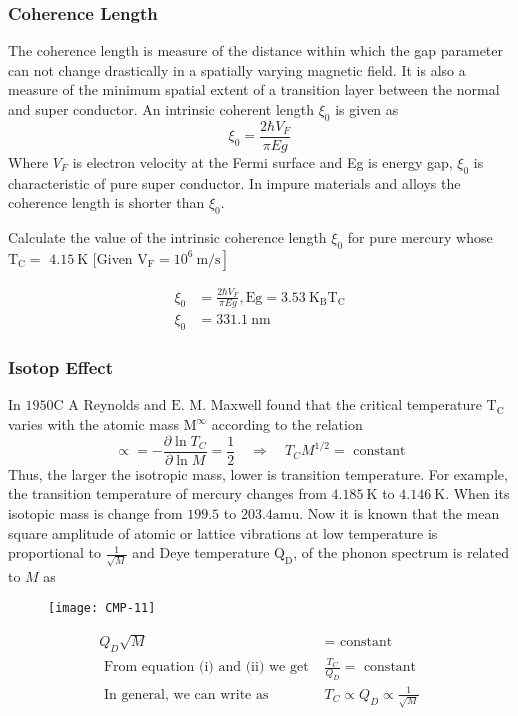 \subsubsection{Coherence Length}
The coherence length is measure of the distance within which the gap parameter can not change drastically in a spatially varying magnetic field. It is also a measure of the minimum spatial extent of a transition layer between the normal and super conductor. An intrinsic coherent length $\xi_{0}$ is given as
$$
\xi_{0}=\frac{2 \hbar V_{F}}{\pi E g}
$$
Where $V_{F}$ is electron velocity at the Fermi surface and Eg is energy gap, $\xi_{0}$ is characteristic of pure super conductor. In impure materials and alloys the coherence length is shorter than $\xi_{0}$.
\begin{exercise}
	 Calculate the value of the intrinsic coherence length $\xi_{0}$ for pure mercury whose $\mathrm{T}_{\mathrm{C}}=$ $4.15 \mathrm{~K}$ [Given $\left.\mathrm{V}_{\mathrm{F}}=10^{6} \mathrm{~m} / \mathrm{s}\right]$
\end{exercise}
\begin{answer}
	\begin{align*}
	\xi_{0}&=\frac{2 \hbar V_{F}}{\pi E g}, \mathrm{Eg}=3.53 \mathrm{~K}_{\mathrm{B}} \mathrm{T}_{\mathrm{C}}\\
	\xi_{0}&=331.1 \mathrm{~nm}
	\end{align*}
\end{answer}
\subsubsection{Isotop Effect}
In $1950 \mathrm{C}$ A Reynolds and $\mathrm{E}$. M. Maxwell found that the critical temperature $\mathrm{T}_{\mathrm{C}}$ varies with the atomic mass $\mathrm{M}^{\infty}$ according to the relation
$$\propto=-\frac{\partial \ln T_{C}}{\partial \ln M}=\frac{1}{2} \quad \Rightarrow \quad T_{C} M^{1 / 2}=\text{ constant}$$
Thus, the larger the isotropic mass, lower is transition temperature. For example, the transition temperature of mercury changes from $4.185 \mathrm{~K}$ to $4.146 \mathrm{~K}$. When its isotopic mass is change from $199.5$ to $203.4 \mathrm{amu}$. Now it is known that the mean square amplitude of atomic or lattice vibrations at low temperature is proportional to $\frac{1}{\sqrt{M}}$ and Deye temperature $\mathrm{Q}_{\mathrm{D}}$, of the phonon spectrum is related to $M$ as
\begin{figure}[H]
	\centering
	\texttt{[image: CMP-11]}
	\caption{}
	\label{}
\end{figure}
\begin{align*}
Q_{D} \sqrt{M}&=\text { constant }\\
\text { From equation (i) and (ii) we get } &\frac{T_{C}}{Q_{D}}=\text { constant }\\
\text { In general, we can write as } &T_{C} \propto Q_{D} \propto \frac{1}{\sqrt{M}}
\end{align*}
